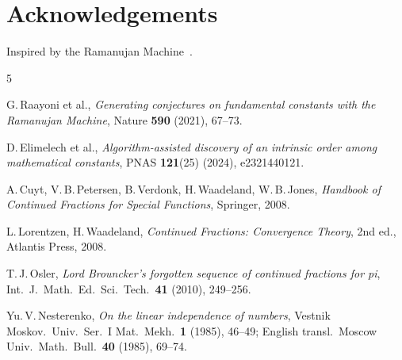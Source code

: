 \documentclass[11pt,a4paper]{article}
\theoremstyle{plain}
\theoremstyle{remark}
\begin{document}
\section*{Acknowledgements}

Inspired by the Ramanujan Machine~\cite{raayoni2021,elimelech2024}.

\begin{thebibliography}{5}

G.\,Raayoni et al.,
\emph{Generating conjectures on fundamental constants with the Ramanujan Machine},
Nature \textbf{590} (2021), 67--73.

D.\,Elimelech et al.,
\emph{Algorithm-assisted discovery of an intrinsic order among mathematical constants},
PNAS \textbf{121}(25) (2024), e2321440121.

A.\,Cuyt, V.\,B.\,Petersen, B.\,Verdonk, H.\,Waadeland, W.\,B.\,Jones,
\emph{Handbook of Continued Fractions for Special Functions},
Springer, 2008.

L.\,Lorentzen, H.\,Waadeland,
\emph{Continued Fractions: Convergence Theory},
2nd ed., Atlantis Press, 2008.

T.\,J.\,Osler,
\emph{Lord Brouncker's forgotten sequence of continued fractions for pi},
Int.\ J.\ Math.\ Ed.\ Sci.\ Tech.\ \textbf{41} (2010), 249--256.

Yu.\,V.\,Nesterenko,
\emph{On the linear independence of numbers},
Vestnik Moskov.\ Univ.\ Ser.~I Mat.\ Mekh.\ \textbf{1} (1985), 46--49;
English transl.\ Moscow Univ.\ Math.\ Bull.\ \textbf{40} (1985), 69--74.

\end{thebibliography}
\end{document}
